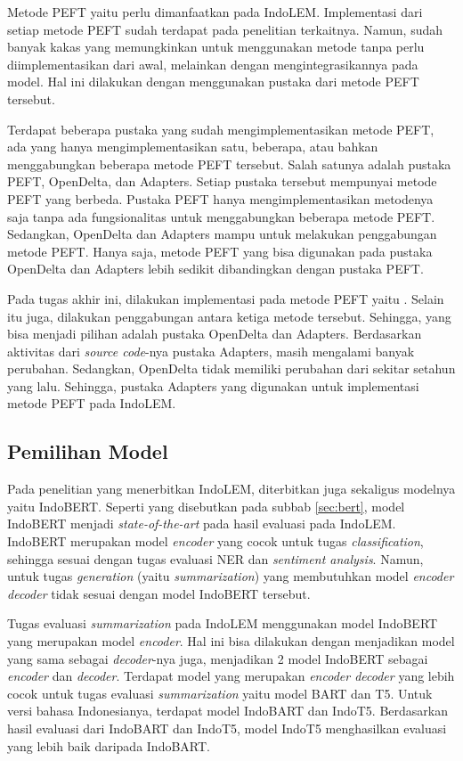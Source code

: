 Metode PEFT yaitu \methodPEFT perlu dimanfaatkan pada IndoLEM. Implementasi dari setiap metode PEFT sudah terdapat pada penelitian terkaitnya. Namun, sudah banyak kakas yang memungkinkan untuk menggunakan metode tanpa perlu diimplementasikan dari awal, melainkan dengan mengintegrasikannya pada model. Hal ini dilakukan dengan menggunakan pustaka dari metode PEFT tersebut.

Terdapat beberapa pustaka yang sudah mengimplementasikan metode PEFT, ada yang hanya mengimplementasikan satu, beberapa, atau bahkan menggabungkan beberapa metode PEFT tersebut. Salah satunya adalah pustaka PEFT, OpenDelta, dan Adapters. Setiap pustaka tersebut mempunyai metode PEFT yang berbeda. Pustaka PEFT hanya mengimplementasikan metodenya saja tanpa ada fungsionalitas untuk menggabungkan beberapa metode PEFT. Sedangkan, OpenDelta dan Adapters mampu untuk melakukan penggabungan metode PEFT. Hanya saja, metode PEFT yang bisa digunakan pada pustaka OpenDelta dan Adapters lebih sedikit dibandingkan dengan pustaka PEFT.

Pada tugas akhir ini,  dilakukan implementasi pada metode PEFT yaitu \methodPEFT. Selain itu juga, dilakukan penggabungan antara ketiga metode tersebut. Sehingga, yang bisa menjadi pilihan adalah pustaka OpenDelta dan Adapters. Berdasarkan aktivitas dari \textit{source code}-nya pustaka Adapters, masih mengalami banyak perubahan. Sedangkan, OpenDelta tidak memiliki perubahan dari sekitar setahun yang lalu. Sehingga, pustaka Adapters yang  digunakan untuk implementasi metode PEFT pada IndoLEM.

\subsection{Pemilihan Model}

Pada penelitian yang menerbitkan IndoLEM, diterbitkan juga sekaligus modelnya yaitu IndoBERT. Seperti yang disebutkan pada subbab \ref{sec:bert}, model IndoBERT menjadi \textit{state-of-the-art} pada hasil evaluasi pada IndoLEM. IndoBERT merupakan model \textit{encoder} yang cocok untuk tugas \textit{classification}, sehingga sesuai dengan tugas evaluasi NER dan \textit{sentiment analysis}. Namun, untuk tugas \textit{generation} (yaitu \textit{summarization}) yang membutuhkan model \textit{encoder decoder} tidak sesuai dengan model IndoBERT tersebut.

Tugas evaluasi \textit{summarization} pada IndoLEM menggunakan model IndoBERT yang merupakan model \textit{encoder}. Hal ini bisa dilakukan dengan menjadikan model yang sama sebagai \textit{decoder}-nya juga, menjadikan 2 model IndoBERT sebagai \textit{encoder} dan \textit{decoder}. Terdapat model yang merupakan \textit{encoder decoder} yang lebih cocok untuk tugas evaluasi \textit{summarization} yaitu model BART dan T5. Untuk versi bahasa Indonesianya, terdapat model IndoBART dan IndoT5. Berdasarkan hasil evaluasi dari IndoBART dan IndoT5, model IndoT5 menghasilkan evaluasi yang lebih baik daripada IndoBART. 

